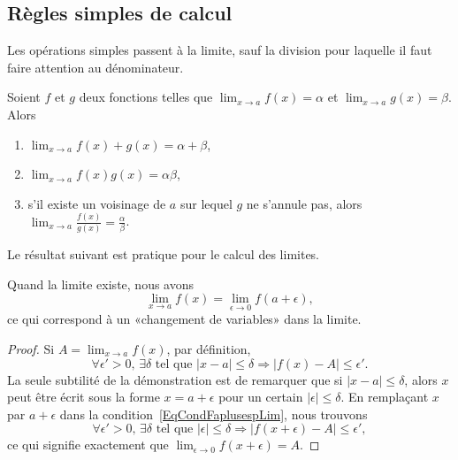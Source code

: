 \subsection{Règles simples de calcul}

Les opérations simples passent à la limite, sauf la division pour laquelle il faut faire attention au dénominateur.
\begin{proposition}     \label{PropOpsSimplesLimites}
    Soient \( f\) et \( g\) deux fonctions telles que \( \lim_{x\to a} f(x)=\alpha\) et \( \lim_{x\to a} g(x)=\beta\). Alors
    \begin{enumerate}
        \item
            \( \lim_{x\to a} f(x)+g(x)=\alpha+\beta\),
        \item
            \( \lim_{x\to a} f(x)g(x)=\alpha\beta\),
        \item
            s'il existe un voisinage de \( a\) sur lequel \( g\) ne s'annule pas, alors \( \lim_{x\to a} \frac{ f(x) }{ g(x) }=\frac{ \alpha }{ \beta }\).
    \end{enumerate}
\end{proposition}

Le résultat suivant est pratique pour le calcul des limites.
\begin{proposition}     \label{PropChmVarLim}
Quand la limite existe, nous avons
\[
  \lim_{x\to a}f(x)=\lim_{\epsilon\to 0}f(a+\epsilon),
\]
ce qui correspond à un «changement de variables» dans la limite.
\end{proposition}

\begin{proof}
Si $A=\lim_{x\to a}f(x)$, par définition,
\begin{equation}        \label{EqCondFaplusespLim}
\forall\epsilon'>0,\,\exists\delta\text{ tel que }| x-a |\leq\delta\Rightarrow| f(x)-A |\leq\epsilon'.
\end{equation}
La seule subtilité de la démonstration est de remarquer que si $| x-a |\leq\delta$, alors $x$ peut être écrit sous la forme $x=a+\epsilon$ pour un certain $| \epsilon |\leq\delta$. En remplaçant $x$ par $a+\epsilon$ dans la condition~\ref{EqCondFaplusespLim}, nous trouvons
\begin{equation}
\forall\epsilon'>0,\,\exists\delta\text{ tel que }| \epsilon |\leq\delta\Rightarrow| f(x+\epsilon)-A |\leq\epsilon',
\end{equation}
ce qui signifie exactement que $\lim_{\epsilon\to 0}f(x+\epsilon)=A$.
\end{proof}

